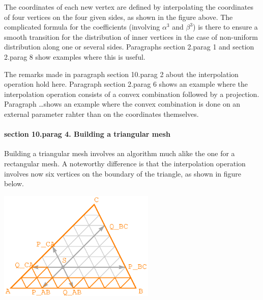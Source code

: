 {The coordinates of each new vertex are defined by interpolating the coordinates of four vertices
on the four given sides, as shown in the figure above.
The complicated formula for the coefficients (involving $ \alpha^3 $ and $ \beta^3 $) is there
to ensure a smooth transition for the distribution of inner vertices in the case of non-uniform
distribution along one or several sides.
Paragraphs \numb section 2.\numb parag 1 and \numb section 2.\numb parag 8
show examples where this is useful.

The remarks made in paragraph \numb section 10.\numb parag 2 about the interpolation operation
hold here.
Paragraph \numb section 2.\numb parag 6 shows an example where the interpolation operation
consists of a convex combination followed by a projection.
Paragraph \dots shows an example where the convex combination is done on an external parameter
rahter than on the coordinates themselves.


\paragraph{\numb section 10.\numb parag 4. Building a triangular mesh}

Building a triangular mesh involves an algorithm much alike the one for a rectangular mesh.
A noteworthy difference is that the interpolation operation involves now six vertices on
the boundary of the triangle, as shown in figure below.

{ 
\centerline{\includegraphics[width=75mm]{fig-triangle.eps}} }

}
